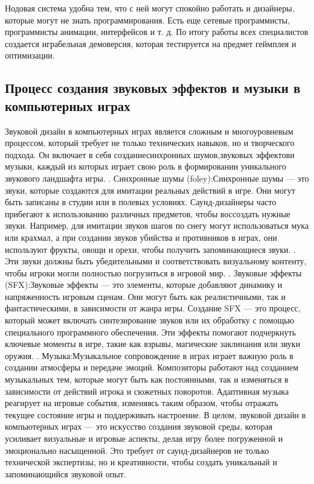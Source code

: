 Нодовая система удобна тем, что с ней могут спокойно работать и дизайнеры, которые могут не знать программирования. Есть еще сетевые программисты, программисты анимации, интерфейсов и т. д.
По итогу работы всех специалистов создается играбельная демоверсия, которая тестируется на предмет геймплея и оптимизации.

\newline
\subsection{Процесс создания звуковых эффектов и музыки в компьютерных играх}
Звуковой дизайн в компьютерных играх является сложным и многоуровневым процессом, который требует не только технических навыков, но и творческого подхода. Он включает в себя созданиесинхронных шумов,звуковых эффектови музыки, каждый из которых играет свою роль в формировании уникального звукового ландшафта игры.
. Синхронные шумы (foley):Синхронные шумы — это звуки, которые создаются для имитации реальных действий в игре. Они могут быть записаны в студии или в полевых условиях. Саунд-дизайнеры часто прибегают к использованию различных предметов, чтобы воссоздать нужные звуки. Например, для имитации звуков шагов по снегу могут использоваться мука или крахмал, а при создании звуков убийства и  противников в играх, они используют фрукты, овощи и орехи, чтобы получить  запоминающиеся звуки. . Эти звуки должны быть убедительными и соответствовать визуальному контенту, чтобы игроки могли полностью погрузиться в игровой мир.
. Звуковые эффекты (SFX):Звуковые эффекты — это элементы, которые добавляют динамику и напряженность игровым сценам. Они могут быть как реалистичными, так и фантастическими, в зависимости от жанра игры. Создание SFX — это процесс, который может включать синтезирование звуков или их обработку с помощью специального программного обеспечения. Эти эффекты помогают подчеркнуть ключевые моменты в игре, такие как взрывы, магические заклинания или звуки оружия.
. Музыка:Музыкальное сопровождение в играх играет важную роль в создании атмосферы и передаче эмоций. Композиторы работают над созданием музыкальных тем, которые могут быть как постоянными, так и изменяться в зависимости от действий игрока и сюжетных поворотов. Адаптивная музыка реагирует на игровые события, изменяясь таким образом, чтобы отражать текущее состояние игры и поддерживать настроение.
В целом, звуковой дизайн в компьютерных играх — это искусство создания звуковой среды, которая усиливает визуальные и игровые аспекты, делая игру более погруженной и эмоционально насыщенной. Это требует от саунд-дизайнеров не только технической экспертизы, но и креативности, чтобы создать уникальный и запоминающийся звуковой опыт.
\newline



